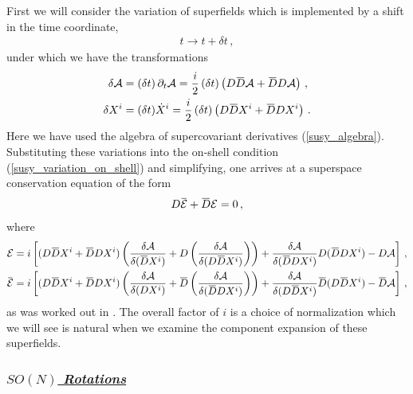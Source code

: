 \documentclass[12pt]{article}
\numberwithin{equation}{section}
\newcommand{\ul}{\underline}
\newcommand{\overbar}[1]{\mkern 1.5mu\overline{\mkern-1.5mu#1\mkern-1.5mu}\mkern 1.5mu}
\newcommand{\Dbar}{\overbar{D}}
\def\cEb{{\overbar{\mathcal{E}}}}
\def\cE{{\mathcal{E}}}
\begin{document}
First we will consider the variation of superfields which is implemented by a shift in the time coordinate,
%
\begin{align}
    t \to t + \delta t \, , 
\end{align}
%
under which we have the transformations
%
\begin{align}\label{time_noether_susy}
    \delta \mathcal{A} &= \left( \delta t \right) \partial_t \mathcal{A} = \frac{i}{2} \left( \delta t \right) \left( D \Dbar \mathcal{A} + \Dbar D \mathcal{A} \right) \, , \nonumber \\
    \delta X^i &= ( \delta t ) \dot{X}^i = \frac{i}{2} \left( \delta t \right) \left( D \Dbar X^i + \Dbar D X^i \right) \, .
\end{align}
%
Here we have used the algebra of supercovariant derivatives (\ref{susy_algebra}). Substituting these variations into the on-shell condition (\ref{susy_variation_on_shell}) and simplifying, one arrives at a superspace conservation equation of the form
%
\begin{align}\label{susy_conservation_E}
    D \cEb + \Dbar \cE = 0 \, ,
\end{align}
%
where
%
\begin{align}\label{susy_Q_def}
    \cE &= i \left[ ( D \Dbar X^i + \Dbar D X^i ) \left( \frac{\delta \mathcal{A}}{\delta ( \Dbar X^i ) } + D \left( \frac{\delta \mathcal{A}}{\delta ( D \Dbar X^i ) } \right) \right) + \frac{\delta \mathcal{A}}{\delta ( \Dbar D X^i ) } D ( \Dbar D X^i ) - D \mathcal{A} \right] \,  , \nonumber \\
    \cEb &= i \left[ ( D \Dbar X^i + \Dbar D X^i ) \left( \frac{\delta \mathcal{A}}{\delta ( D X^i ) } + \Dbar \left( \frac{\delta \mathcal{A}}{\delta ( \Dbar D X^i ) } \right) \right) + \frac{\delta \mathcal{A}}{\delta ( D \Dbar X^i ) } \Dbar ( D \Dbar X^i ) - \Dbar \mathcal{A} \right] \, ,
\end{align}
%
as was worked out in \cite{Ebert:2022xfh}. The overall factor of $i$ is a choice of normalization which we will see is natural when we examine the component expansion of these superfields.

\subsubsection*{\ul{\it $SO(N)$ Rotations}}
\end{document}
